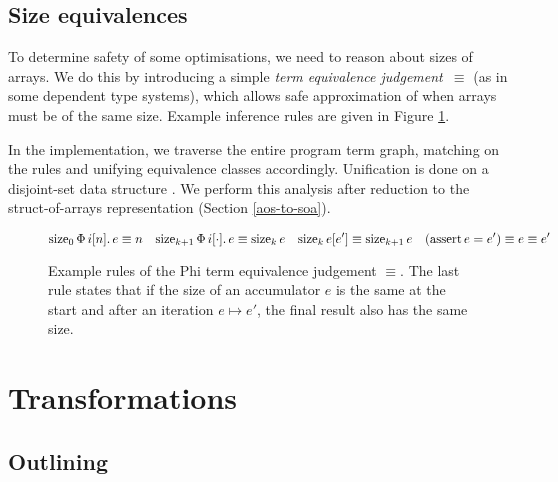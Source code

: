 \subsection{Size equivalences}

To determine safety of some optimisations, we need to reason about sizes of arrays. We do this by introducing a simple \textit{term equivalence judgement~$\equiv$} (as in some dependent type systems), which allows safe approximation of when arrays must be of the same size. Example inference rules are given in Figure \ref{fig:term-equivalence}.

In the implementation, we traverse the entire program term graph, matching on the rules and unifying equivalence classes accordingly. Unification is done on a disjoint-set data structure \cite{cormen2022introduction}. We perform this analysis after reduction to the struct-of-arrays representation (Section \ref{aos-to-soa}).

\begin{figure}[h]
    \centering
    $$
    \phisize{\phivec{i}{n}{e}}{0} \equiv n
    \quad
    \phisize{\phivec{i}{\cdot}{e}}{k+1} \equiv \phisize{e}{k}
    \quad
    \phisize{e[e']}{k} \equiv \phisize{e}{k+1}
    \quad
    (\phiasserteq{e}{e'}) \equiv e \equiv e'
    $$
    \begin{prooftree}
    \end{prooftree}
    \caption{Example rules of the Phi term equivalence judgement $\equiv$. The last rule states that if the size of an accumulator $e$ is the same at the start and after an iteration $e \mapsto e'$, the final result also has the same size.}
    \label{fig:term-equivalence}
\end{figure}


\section{Transformations}
\label{compiler-transformations}

\subsection{Outlining}


